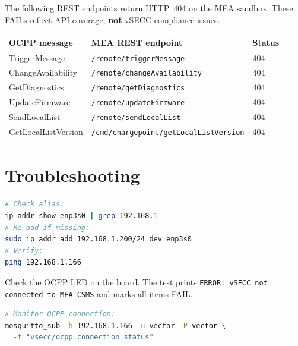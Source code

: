 \documentclass[11pt, a4paper]{article}
\begin{document}
The following REST endpoints return HTTP~404 on the MEA sandbox.
These FAILs reflect API coverage, \textbf{not} vSECC compliance issues.

\begin{center}
\begin{tabular}{L{4.5cm} L{7cm} C{2cm}}
\toprule
\textbf{OCPP message} & \textbf{MEA REST endpoint} & \textbf{Status} \\
\midrule
TriggerMessage       & \texttt{/remote/triggerMessage}         & \textcolor{failred}{404} \\
ChangeAvailability   & \texttt{/remote/changeAvailability}     & \textcolor{failred}{404} \\
GetDiagnostics       & \texttt{/remote/getDiagnostics}         & \textcolor{failred}{404} \\
UpdateFirmware       & \texttt{/remote/updateFirmware}         & \textcolor{failred}{404} \\
SendLocalList        & \texttt{/remote/sendLocalList}          & \textcolor{failred}{404} \\
GetLocalListVersion  & \texttt{/cmd/chargepoint/getLocalListVersion} & \textcolor{failred}{404} \\
\bottomrule
\end{tabular}
\end{center}

\section{Troubleshooting}

\begin{tcolorbox}[noteboxstyle={vSECC not reachable (Connection timeout)}]
\begin{lstlisting}[language=bash]
# Check alias:
ip addr show enp3s0 | grep 192.168.1
# Re-add if missing:
sudo ip addr add 192.168.1.200/24 dev enp3s0
# Verify:
ping 192.168.1.166
\end{lstlisting}
\end{tcolorbox}

\begin{tcolorbox}[noteboxstyle={vSECC not connected to MEA CSMS}]
Check the OCPP LED on the board.
The test prints \texttt{ERROR: vSECC not connected to MEA CSMS} and marks
all items FAIL.
\begin{lstlisting}[language=bash]
# Monitor OCPP connection:
mosquitto_sub -h 192.168.1.166 -u vector -P vector \
  -t "vsecc/ocpp_connection_status"
\end{lstlisting}
\end{tcolorbox}
\end{document}
